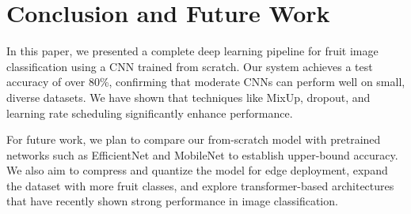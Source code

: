\documentclass{article}
\begin{document}
\section{Conclusion and Future Work}
In this paper, we presented a complete deep learning pipeline for fruit image classification using a CNN trained from scratch. Our system achieves a test accuracy of over 80\%, confirming that moderate CNNs can perform well on small, diverse datasets. We have shown that techniques like MixUp, dropout, and learning rate scheduling significantly enhance performance.

For future work, we plan to compare our from-scratch model with pretrained networks such as EfficientNet and MobileNet to establish upper-bound accuracy. We also aim to compress and quantize the model for edge deployment, expand the dataset with more fruit classes, and explore transformer-based architectures that have recently shown strong performance in image classification.



\end{document}
